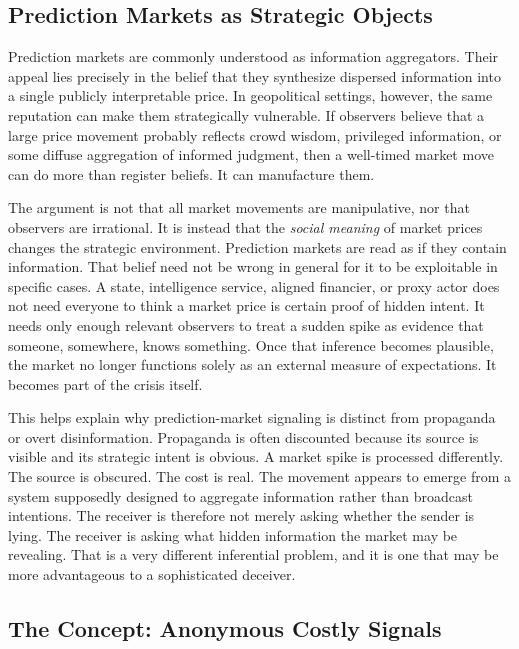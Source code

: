 \documentclass[12pt]{article}
\begin{document}
\subsection{Prediction Markets as Strategic Objects}

Prediction markets are commonly understood as information aggregators. Their appeal lies precisely in the belief that they synthesize dispersed information into a single publicly interpretable price. In geopolitical settings, however, the same reputation can make them strategically vulnerable. If observers believe that a large price movement probably reflects crowd wisdom, privileged information, or some diffuse aggregation of informed judgment, then a well-timed market move can do more than register beliefs. It can manufacture them.

The argument is not that all market movements are manipulative, nor that observers are irrational. It is instead that the \textit{social meaning} of market prices changes the strategic environment. Prediction markets are read as if they contain information. That belief need not be wrong in general for it to be exploitable in specific cases. A state, intelligence service, aligned financier, or proxy actor does not need everyone to think a market price is certain proof of hidden intent. It needs only enough relevant observers to treat a sudden spike as evidence that someone, somewhere, knows something. Once that inference becomes plausible, the market no longer functions solely as an external measure of expectations. It becomes part of the crisis itself.

This helps explain why prediction-market signaling is distinct from propaganda or overt disinformation. Propaganda is often discounted because its source is visible and its strategic intent is obvious. A market spike is processed differently. The source is obscured. The cost is real. The movement appears to emerge from a system supposedly designed to aggregate information rather than broadcast intentions. The receiver is therefore not merely asking whether the sender is lying. The receiver is asking what hidden information the market may be revealing. That is a very different inferential problem, and it is one that may be more advantageous to a sophisticated deceiver.

\subsection{The Concept: Anonymous Costly Signals}
\end{document}
